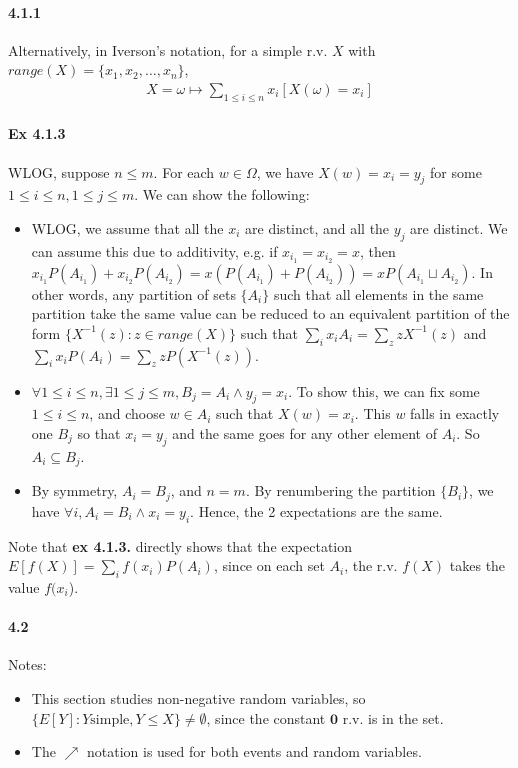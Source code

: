 \documentclass[a4paper]{article}
\newcommand{\seq}[2]{#1_1,#1_2,\dots,#1_{#2}} %
\begin{document}
\paragraph{4.1.1} Alternatively, in Iverson's notation, for a simple r.v. $X$ with $range(X) = \{\seq{x}{n}\}$,
\begin{align*}
	X = \omega\mapsto\sum_{1\leq i\leq n}x_i[X(\omega) = x_i]
\end{align*}

\paragraph{Ex 4.1.3} WLOG, suppose $n\leq m$. For each $w\in \Omega$, we have $X(w) = x_i = y_j$ for some $1\leq i\leq n, 1\leq j\leq m$. We can show the following:
\begin{itemize}
	\item WLOG, we assume that all the $x_i$ are distinct, and all the $y_j$ are distinct. We can assume this due to additivity, e.g. if $x_{i_1} = x_{i_2} = x$, then $x_{i_1}P(A_{i_1}) + x_{i_2}P(A_{i_2}) = x(P(A_{i_1}) + P(A_{i_2})) = xP(A_{i_1}\sqcup A_{i_2})$. In other words, any partition of sets $\{A_i\}$ such that all elements in the same partition take the same value can be reduced to an equivalent partition of the form $\{X^{-1}(z) : z\in range(X)\}$ such that $\sum_i x_i A_i = \sum_z zX^{-1}(z)$ and $\sum_i x_iP(A_i) = \sum_z zP(X^{-1}(z))$.
	\item $\forall 1\leq i\leq n, \exists 1\leq j\leq m, B_j = A_i\land y_j = x_i$. To show this, we can fix some $1\leq i\leq n$, and choose $w\in A_i$ such that $X(w) = x_i$. This $w$ falls in exactly one $B_j$ so that $x_i = y_j$ and the same goes for any other element of $A_i$. So $A_i\subseteq B_j$.
	\item By symmetry, $A_i = B_j$, and $n = m$. By renumbering the partition $\{B_i\}$, we have $\forall i, A_i = B_i\land x_i = y_i$. Hence, the 2 expectations are the same.
\end{itemize}

Note that \textbf{ex 4.1.3.} directly shows that the expectation $E[f(X)] = \sum_i f(x_i)P(A_i)$, since on each set $A_i$, the r.v. $f(X)$ takes the value $f(x_i$).

\paragraph{4.2} Notes:
\begin{itemize}
	\item This section studies non-negative random variables, so $\{E[Y] : Y \text{simple}, Y\leq X\}\neq \emptyset$, since the constant $\mathbf{0}$ r.v. is in the set.
	\item The $\nearrow$ notation is used for both events and random variables.
\end{itemize}
\end{document}
